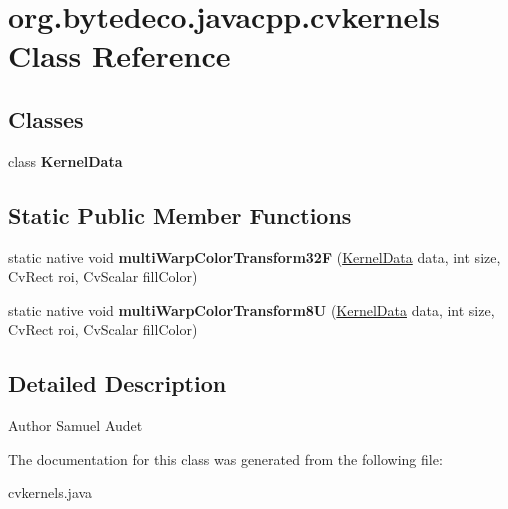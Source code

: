 \hypertarget{classorg_1_1bytedeco_1_1javacpp_1_1cvkernels}{}\section{org.\+bytedeco.\+javacpp.\+cvkernels Class Reference}
\label{classorg_1_1bytedeco_1_1javacpp_1_1cvkernels}
\subsection*{Classes}
\begin{DoxyCompactItemize}
\item 
class {\bfseries Kernel\+Data}
\end{DoxyCompactItemize}
\subsection*{Static Public Member Functions}
\begin{DoxyCompactItemize}
\item 
\mbox{\label{classorg_1_1bytedeco_1_1javacpp_1_1cvkernels_a03c1bbd2c01514456b0636f9857a289a}} 
static native void {\bfseries multi\+Warp\+Color\+Transform32F} (\hyperlink{struct_kernel_data}{Kernel\+Data} data, int size, Cv\+Rect roi, Cv\+Scalar fill\+Color)
\item 
\mbox{\label{classorg_1_1bytedeco_1_1javacpp_1_1cvkernels_adb044b0e81b4ee560384b554bfb512ac}} 
static native void {\bfseries multi\+Warp\+Color\+Transform8U} (\hyperlink{struct_kernel_data}{Kernel\+Data} data, int size, Cv\+Rect roi, Cv\+Scalar fill\+Color)
\end{DoxyCompactItemize}


\subsection{Detailed Description}
\begin{DoxyAuthor}{Author}
Samuel Audet 
\end{DoxyAuthor}


The documentation for this class was generated from the following file\+:\begin{DoxyCompactItemize}
\item 
cvkernels.\+java\end{DoxyCompactItemize}
